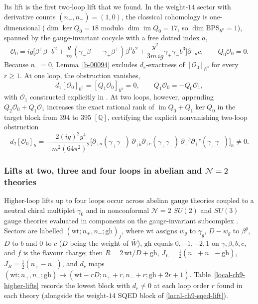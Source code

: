 \documentclass[11pt]{article}
\numberwithin{equation}{section}
\numberwithin{figure}{section}
\numberwithin{table}{section}
\begin{document}
Its lift is the first two-loop lift that we found. In the weight-$14$ sector with derivative counts $(n_+,n_-)=(1,0)$, the classical cohomology is one-dimensional ($\dim\ker Q_0=18$ modulo $\dim\operatorname{im}Q_0=17$, so $\dim\mathrm{BPS}_{\hbar^0}=1$), spanned by the gauge-invariant cocycle with a free dotted index $\dot a$,
\begin{equation}\label{local-ch9-sqed-source}
\mathcal O_0=ig\Big[\beta^+\beta^-b^2
+\frac ym(\gamma_-\beta^--\gamma_+\beta^+)\beta^0b^2
+\frac{y^2}{3m\,ig}\gamma_+\gamma_-b^3\Big]
\partial_{+\dot a}c,
\qquad Q_0\mathcal O_0=0.
\end{equation}
Because $n_-=0$, Lemma~\ref{b-00094} excludes $d_r$-exactness of $[\mathcal O_0]_{\hbar^0}$ for every $r\ge1$. At one loop, the obstruction vanishes,
\begin{equation}\label{local-ch9-sqed-d1}
d_1[\mathcal O_0]_{\hbar^0}=[Q_1\mathcal O_0]_{\hbar^0}=0,\qquad Q_1\mathcal O_0=-Q_0\mathcal O_1,
\end{equation}
with $\mathcal O_1$ constructed explicitly in \cite[supplement, Section S8.1]{Repo}. At two loops, however, appending $Q_2\mathcal O_0+Q_1\mathcal O_1$ increases the exact rational rank of $\operatorname{im}Q_0+Q_1\ker Q_0$ in the target block from $394$ to $395$ $[\mathbb Q]$, certifying the explicit nonvanishing two-loop obstruction
\begin{equation}\label{local-ch9-sqed-lift}
d_2[\mathcal O_0]_{\hbar}
=-\frac{2(ig)^2y^4}{m^2(64\pi^2)^2}\Big[
\partial_{+\dot a}(\gamma_+\gamma_-)
\,\partial_{+\dot b}\partial_{+\dot c}(\gamma_+\gamma_-)
\,\partial_+{}^{\dot b}\partial_+{}^{\dot c}(\gamma_+\gamma_-)
\Big]_{\hbar}\ne0.
\end{equation}

\subsubsection{Lifts at two, three and four loops in abelian and $\mathcal N=2$ theories}\label{sec-results-higher}

Higher-loop lifts up to four loops occur across abelian gauge theories coupled to a neutral chiral multiplet $\gamma_0$ and in nonconformal $\mathcal N=2$ $SU(2)$ and $SU(3)$ gauge theories evaluated in components on the gauge-invariant subcomplex \cite[results report, \S8--\S9]{Repo}. Sectors are labelled $(\mathrm{wt};n_+,n_-;\mathrm{gh})_f$, where $\mathrm{wt}$ assigns $w_g$ to $\gamma_g$, $D-w_g$ to $\beta^g$, $D$ to $b$ and $0$ to $c$ ($D$ being the weight of $\bar W$), $\mathrm{gh}$ equals $0,-1,-2,1$ on $\gamma,\beta,b,c$, and $f$ is the flavour charge; then $R=2\,\mathrm{wt}/D+\mathrm{gh}$, $J_L=\tfrac12(n_++n_--\mathrm{gh})$, $J_R=\tfrac12(n_+-n_-)$, and $d_r$ maps $(\mathrm{wt};n_+,n_-;\mathrm{gh})\to(\mathrm{wt}-rD;n_++r,n_-+r;\mathrm{gh}+2r+1)$. Table~\ref{local-ch9-higher-lifts} records the lowest block with $d_r\ne0$ at each loop order $r$ found in each theory (alongside the weight-$14$ SQED block of \eqref{local-ch9-sqed-lift}).
\end{document}
